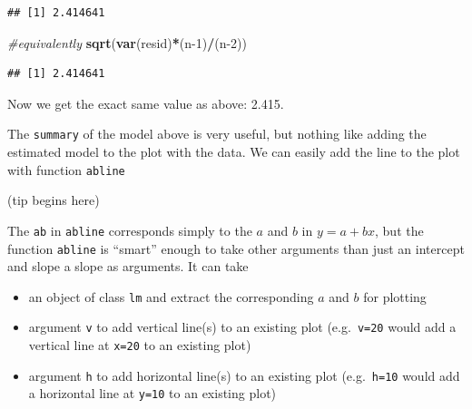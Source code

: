 \documentclass[
]{book}
\newenvironment{Shaded}{\begin{snugshade}}{\end{snugshade}}
\newcommand{\CommentTok}[1]{\textcolor[rgb]{0.56,0.35,0.01}{\textit{#1}}}
\newcommand{\DecValTok}[1]{\textcolor[rgb]{0.00,0.00,0.81}{#1}}
\newcommand{\FunctionTok}[1]{\textcolor[rgb]{0.13,0.29,0.53}{\textbf{#1}}}
\newcommand{\NormalTok}[1]{#1}
\newcommand{\OtherTok}[1]{\textcolor[rgb]{0.56,0.35,0.01}{#1}}
\newcommand{\SpecialCharTok}[1]{\textcolor[rgb]{0.81,0.36,0.00}{\textbf{#1}}}
\providecommand{\tightlist}{%
  \setlength{\itemsep}{0pt}\setlength{\parskip}{0pt}}
\begin{document}
\begin{Shaded}
\end{Shaded}

\begin{verbatim}
## [1] 2.414641
\end{verbatim}

\begin{Shaded}
\begin{Highlighting}[]
\CommentTok{\#equivalently}
\FunctionTok{sqrt}\NormalTok{(}\FunctionTok{var}\NormalTok{(resid)}\SpecialCharTok{*}\NormalTok{(n}\DecValTok{{-}1}\NormalTok{)}\SpecialCharTok{/}\NormalTok{(n}\DecValTok{{-}2}\NormalTok{))}
\end{Highlighting}
\end{Shaded}

\begin{verbatim}
## [1] 2.414641
\end{verbatim}

Now we get the exact same value as above: 2.415.

The \texttt{summary} of the model above is very useful, but nothing like adding the estimated model to the plot with the data. We can easily add the line to the plot with function \texttt{abline}

(tip begins here)

The \texttt{ab} in \texttt{abline} corresponds simply to the \(a\) and \(b\) in \(y=a+bx\), but the function \texttt{abline} is ``smart'' enough to take other arguments than just an intercept and slope a slope as arguments. It can take

\begin{itemize}
\tightlist
\item
  an object of class \texttt{lm} and extract the corresponding \(a\) and \(b\) for plotting
\item
  argument \texttt{v} to add vertical line(s) to an existing plot (e.g.~\texttt{v=20} would add a vertical line at \texttt{x=20} to an existing plot)
\item
  argument \texttt{h} to add horizontal line(s) to an existing plot (e.g.~\texttt{h=10} would add a horizontal line at \texttt{y=10} to an existing plot)
\end{itemize}
\end{document}
